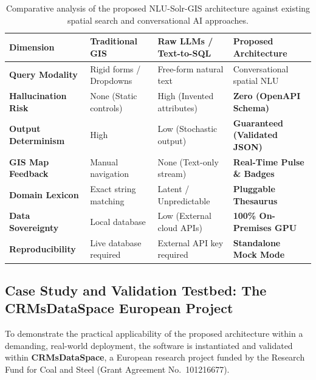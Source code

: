 \begin{table}[h!]
    \centering
    \small
    \setlength{\tabcolsep}{5pt}
    \caption{Comparative analysis of the proposed NLU-Solr-GIS architecture against existing spatial search and conversational AI approaches.}
    \label{tab:tool_comparison}
    \begin{tabularx}{\linewidth}{>{\raggedright\arraybackslash\bfseries}p{3.4cm}>{\raggedright\arraybackslash}X>{\raggedright\arraybackslash}X>{\raggedright\arraybackslash}X}
        \toprule
        \textbf{Dimension} & \textbf{Traditional GIS} & \textbf{Raw LLMs / Text-to-SQL} & \textbf{Proposed Architecture} \\
        \midrule
        Query Modality & Rigid forms / Dropdowns & Free-form natural text & Conversational spatial NLU \\
        Hal\-lu\-ci\-na\-tion Risk & None (Static controls) & High (Invented attributes) & \textbf{Zero (OpenAPI Schema)} \\
        Output Determinism & High & Low (Stochastic output) & \textbf{Guaranteed (Validated JSON)} \\
        GIS Map Feedback & Manual navigation & None (Text-only stream) & \textbf{Real-Time Pulse \& Badges} \\
        Domain Lexicon & Exact string matching & Latent / Unpredictable & \textbf{Pluggable Thesaurus} \\
        Data Sovereignty & Local database & Low (External cloud APIs) & \textbf{100\% On-Premises GPU} \\
        Repro\-duci\-bil\-i\-ty & Live database required & External API key required & \textbf{Standalone Mock Mode} \\
        \bottomrule
    \end{tabularx}
\end{table}

\subsection{Case Study and Validation Testbed: The CRMsDataSpace European Project}
\label{subsec:CaseStudyContext}

To demonstrate the practical applicability of the proposed architecture within a demanding, real-world deployment, the software is instantiated and validated within \textbf{CRMsDataSpace}, a European research project funded by the Research Fund for Coal and Steel (Grant Agreement No.~101216677). 

